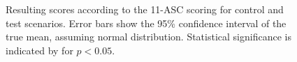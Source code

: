 \begin{figure}
    \centering
    \ifgraphics
    \fi
    \caption{
        Resulting scores according to the \ac{11-ASC} scoring for control and test scenarios.
        Error bars show the 95\% confidence interval of the true mean, assuming normal distribution.
        Statistical significance is indicated by \raisebox{-0.7ex}{*} for $p < 0.05$.
    }
    \label{fig:results-11-asc}
\end{figure}
